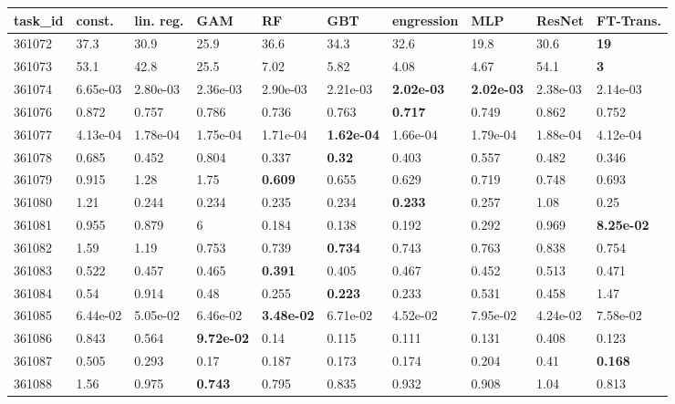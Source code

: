 \begin{table}[ht!]
\centering
\begingroup\footnotesize
\begin{tabular}{llllllllll}
  \hline
\hline
task\_id & const. & lin. reg. & GAM & RF & GBT & engression & MLP & ResNet & FT-Trans. \\ 
  \hline
361072 & 37.3 & 30.9 & 25.9 & 36.6 & 34.3 & 32.6 & 19.8 & 30.6 & \textbf{19} \\ 
  361073 & 53.1 & 42.8 & 25.5 & 7.02 & 5.82 & 4.08 & 4.67 & 54.1 & \textbf{3} \\ 
  361074 & 6.65e-03 & 2.80e-03 & 2.36e-03 & 2.90e-03 & 2.21e-03 & \textbf{2.02e-03} & \textbf{2.02e-03} & 2.38e-03 & 2.14e-03 \\ 
  361076 & 0.872 & 0.757 & 0.786 & 0.736 & 0.763 & \textbf{0.717} & 0.749 & 0.862 & 0.752 \\ 
  361077 & 4.13e-04 & 1.78e-04 & 1.75e-04 & 1.71e-04 & \textbf{1.62e-04} & 1.66e-04 & 1.79e-04 & 1.88e-04 & 4.12e-04 \\ 
  361078 & 0.685 & 0.452 & 0.804 & 0.337 & \textbf{0.32} & 0.403 & 0.557 & 0.482 & 0.346 \\ 
  361079 & 0.915 & 1.28 & 1.75 & \textbf{0.609} & 0.655 & 0.629 & 0.719 & 0.748 & 0.693 \\ 
  361080 & 1.21 & 0.244 & 0.234 & 0.235 & 0.234 & \textbf{0.233} & 0.257 & 1.08 & 0.25 \\ 
  361081 & 0.955 & 0.879 & 6 & 0.184 & 0.138 & 0.192 & 0.292 & 0.969 & \textbf{8.25e-02} \\ 
  361082 & 1.59 & 1.19 & 0.753 & 0.739 & \textbf{0.734} & 0.743 & 0.763 & 0.838 & 0.754 \\ 
  361083 & 0.522 & 0.457 & 0.465 & \textbf{0.391} & 0.405 & 0.467 & 0.452 & 0.513 & 0.471 \\ 
  361084 & 0.54 & 0.914 & 0.48 & 0.255 & \textbf{0.223} & 0.233 & 0.531 & 0.458 & 1.47 \\ 
  361085 & 6.44e-02 & 5.05e-02 & 6.46e-02 & \textbf{3.48e-02} & 6.71e-02 & 4.52e-02 & 7.95e-02 & 4.24e-02 & 7.58e-02 \\ 
  361086 & 0.843 & 0.564 & \textbf{9.72e-02} & 0.14 & 0.115 & 0.111 & 0.131 & 0.408 & 0.123 \\ 
  361087 & 0.505 & 0.293 & 0.17 & 0.187 & 0.173 & 0.174 & 0.204 & 0.41 & \textbf{0.168} \\ 
  361088 & 1.56 & 0.975 & \textbf{0.743} & 0.795 & 0.835 & 0.932 & 0.908 & 1.04 & 0.813 \\ 

\end{tabular}
\end{table}

